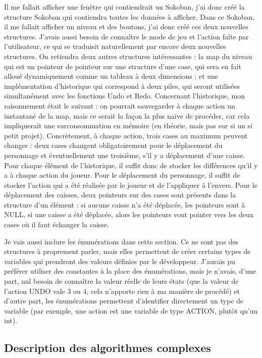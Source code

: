 \documentclass[11pt]{article}
\begin{document}
Il me fallait afficher une fenêtre qui contiendrait un Sokoban, j'ai donc créé
la structure Sokoban qui contiendra toutes les données à afficher.  Dans ce
Sokoban, il me fallait afficher un niveau et des boutons, j'ai donc créé ces
deux nouvelles structures. J'avais aussi besoin de connaître le mode de jeu et
l'action faîte par l'utilisateur, ce qui se traduisit naturellement par encore
deux nouvelles structures.  On retiendra deux autres structures intéressantes :
la map du niveau qui est un pointeur de pointeur sur une structure d'une case,
qui sera en fait alloué dynamiquement comme un tableau à deux dimensions ; et
une implémentation d'historique qui correspond à deux piles, qui seront
utilisées simultanément avec les fonctions Undo et Redo.  Concernant
l'historique, mon raisonnement était le suivant : on pourrait sauvegarder à
chaque action un instantané de la map, mais ce serait la façon la plus naïve de
procéder, car cela impliquerait une surconsommation en mémoire (en théorie, mais
pas sur si un si petit projet). Concrètement, à chaque action, trois cases au
maximum peuvent changer : deux cases changent obligatoirement pour le
déplacement du personnage et éventuellement une troisième, s'il y a déplacement
d'une caisse.  Pour chaque élément de l'historique, il suffit donc de stocker
les différences qu'il y a à chaque action du joueur. Pour le déplacement du
personnage, il suffit de stocker l'action qui a été réalisée par le joueur et de
l'appliquer à l'envers. Pour le déplacement des caisses, deux pointeurs sur des
cases sont présents dans la structure d'un élément : si aucune caisse n'a été
déplacée, les pointeurs sont à NULL, si une caisse a été déplacée, alors les
pointeurs vont pointer vers les deux cases où il faut échanger la caisse.

Je vais aussi inclure les énumérations dans cette section. Ce ne sont pas des
structures à proprement parler, mais elles permettent de créer certains types de
variables qui prendront des valeurs définies par le développeur.  J'aurais pu
préférer utiliser des constantes à la place des énumérations, mais je n'avais,
d'une part, nul besoin de connaître la valeur réelle de leurs états (que la
valeur de l'action UNDO vale 3 ou 4, cela n'apporte rien à ma manière de
procédé) et d'autre part, les énumérations permettent d'identifier directement
un type de variable (par exemple, une action est une variable de type ACTION,
plutôt qu'un int).

\subsection{Description des algorithmes complexes}
\end{document}
